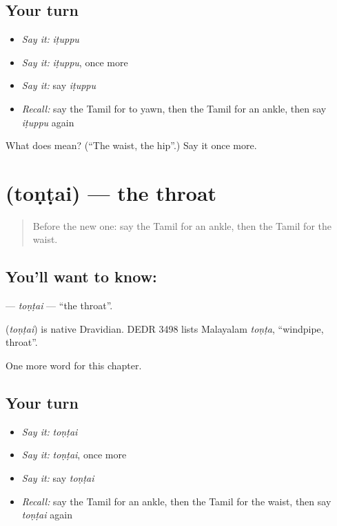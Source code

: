 \subsection*{Your turn}
\begin{itemize}
\raggedright
  \item \emph{Say it:} \emph{iṭuppu}
  \item \emph{Say it:} \emph{iṭuppu}, once more
  \item \emph{Say it:} say \emph{iṭuppu}
  \item \emph{Recall:} say the Tamil for to yawn, then the Tamil for an ankle, then say \emph{iṭuppu} again
\end{itemize}

\begin{tcolorbox}[breakable,colback=teal!4,colframe=teal!35!black,title={Before you move on}]
What does  mean? (\textquotedblleft{}The waist, the hip\textquotedblright{}.) Say it once more.
\end{tcolorbox}
\section[\texorpdfstring{\ta{தொண்டை} (toṇṭai)}{தொண்டை (toṇṭai)}]{ (toṇṭai) — the throat}

\label{lesson:TA-C169-tontai}



\begin{quote}
Before the new one: say the Tamil for an ankle, then the Tamil for the waist.
\end{quote}

\subsection*{You'll want to know: }
\textbf{} — \emph{toṇṭai} — \textquotedblleft{}the throat\textquotedblright{}.

\begin{cousinweb}
\textbf{} (\emph{toṇṭai}) is native Dravidian. DEDR 3498 lists Malayalam \emph{toṇṭa}, \textquotedblleft{}windpipe, throat\textquotedblright{}.
\end{cousinweb}

\begin{grammarlens}[title={What you've built}]
One more word for this chapter.
\end{grammarlens}

\subsection*{Your turn}
\begin{itemize}
\raggedright
  \item \emph{Say it:} \emph{toṇṭai}
  \item \emph{Say it:} \emph{toṇṭai}, once more
  \item \emph{Say it:} say \emph{toṇṭai}
  \item \emph{Recall:} say the Tamil for an ankle, then the Tamil for the waist, then say \emph{toṇṭai} again
\end{itemize}


